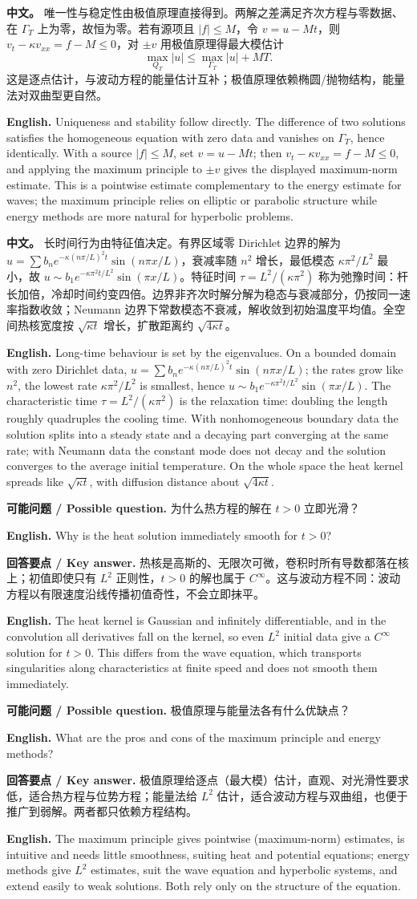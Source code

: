 \documentclass[UTF8,11pt,a4paper]{ctexart}
\newcommand{\EN}[1]{\par\noindent \textbf{English.} #1\par}
\newcommand{\ASK}[4]{\par\noindent \textbf{可能问题 / Possible question.} #1\par\EN{#2}\noindent \textbf{回答要点 / Key answer.} #3\par\EN{#4}\medskip}
\newcommand{\APS}[2]{\par\noindent\textbf{中文。} #1\par\noindent\textbf{English.} #2\par\smallskip}
\begin{document}
\APS{唯一性与稳定性由极值原理直接得到。两解之差满足齐次方程与零数据、在 $\Gamma_T$ 上为零，故恒为零。若有源项且 $|f|\le M$，令 $v=u-Mt$，则 $v_t-\kappa v_{xx}=f-M\le0$，对 $\pm v$ 用极值原理得最大模估计
\[
\max_{Q_T}|u|\le\max_{\Gamma_T}|u|+MT .
\]
这是逐点估计，与波动方程的能量估计互补；极值原理依赖椭圆/抛物结构，能量法对双曲型更自然。}{Uniqueness and stability follow directly. The difference of two solutions satisfies the homogeneous equation with zero data and vanishes on $\Gamma_T$, hence identically. With a source $|f|\le M$, set $v=u-Mt$; then $v_t-\kappa v_{xx}=f-M\le0$, and applying the maximum principle to $\pm v$ gives the displayed maximum-norm estimate. This is a pointwise estimate complementary to the energy estimate for waves; the maximum principle relies on elliptic or parabolic structure while energy methods are more natural for hyperbolic problems.}
\APS{长时间行为由特征值决定。有界区域零 Dirichlet 边界的解为 $u=\sum b_ne^{-\kappa(n\pi/L)^2t}\sin(n\pi x/L)$，衰减率随 $n^2$ 增长，最低模态 $\kappa\pi^2/L^2$ 最小，故 $u\sim b_1e^{-\kappa\pi^2t/L^2}\sin(\pi x/L)$。特征时间 $\tau=L^2/(\kappa\pi^2)$ 称为弛豫时间：杆长加倍，冷却时间约变四倍。边界非齐次时解分解为稳态与衰减部分，仍按同一速率指数收敛；Neumann 边界下常数模态不衰减，解收敛到初始温度平均值。全空间热核宽度按 $\sqrt{\kappa t}$ 增长，扩散距离约 $\sqrt{4\kappa t}$。}{Long-time behaviour is set by the eigenvalues. On a bounded domain with zero Dirichlet data, $u=\sum b_ne^{-\kappa(n\pi/L)^2t}\sin(n\pi x/L)$; the rates grow like $n^2$, the lowest rate $\kappa\pi^2/L^2$ is smallest, hence $u\sim b_1e^{-\kappa\pi^2t/L^2}\sin(\pi x/L)$. The characteristic time $\tau=L^2/(\kappa\pi^2)$ is the relaxation time: doubling the length roughly quadruples the cooling time. With nonhomogeneous boundary data the solution splits into a steady state and a decaying part converging at the same rate; with Neumann data the constant mode does not decay and the solution converges to the average initial temperature. On the whole space the heat kernel spreads like $\sqrt{\kappa t}$, with diffusion distance about $\sqrt{4\kappa t}$.}
\ASK{为什么热方程的解在 $t>0$ 立即光滑？}{Why is the heat solution immediately smooth for $t>0$?}{热核是高斯的、无限次可微，卷积时所有导数都落在核上；初值即使只有 $L^2$ 正则性，$t>0$ 的解也属于 $C^\infty$。这与波动方程不同：波动方程以有限速度沿线传播初值奇性，不会立即抹平。}{The heat kernel is Gaussian and infinitely differentiable, and in the convolution all derivatives fall on the kernel, so even $L^2$ initial data give a $C^\infty$ solution for $t>0$. This differs from the wave equation, which transports singularities along characteristics at finite speed and does not smooth them immediately.}
\ASK{极值原理与能量法各有什么优缺点？}{What are the pros and cons of the maximum principle and energy methods?}{极值原理给逐点（最大模）估计，直观、对光滑性要求低，适合热方程与位势方程；能量法给 $L^2$ 估计，适合波动方程与双曲组，也便于推广到弱解。两者都只依赖方程结构。}{The maximum principle gives pointwise (maximum-norm) estimates, is intuitive and needs little smoothness, suiting heat and potential equations; energy methods give $L^2$ estimates, suit the wave equation and hyperbolic systems, and extend easily to weak solutions. Both rely only on the structure of the equation.}
\end{document}
